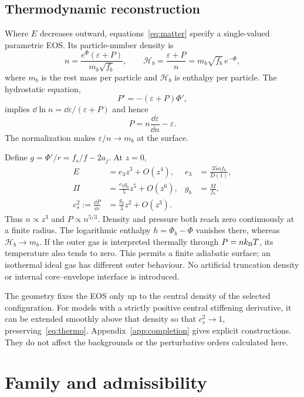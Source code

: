 \subsection{Thermodynamic reconstruction}
Where $E$ decreases outward, equations~\eqref{eq:matter} specify a single-valued parametric EOS. Its particle-number density is
\begin{equation}
 n=\frac{e^\Phi(\varepsilon+P)}{m_b\sqrt{f_b}},
 \qquad \mathcal H_b=\frac{\varepsilon+P}{n}=m_b\sqrt{f_b}\,e^{-\Phi},
 \label{eq:n}
\end{equation}
where $m_b$ is the rest mass per particle and $\mathcal H_b$ is enthalpy per particle. The hydrostatic equation,
\begin{equation}
 P'=-(\varepsilon+P)\Phi',
\end{equation}
implies $\dd\ln n=\dd\varepsilon/(\varepsilon+P)$ and hence
\begin{equation}
 P=n\frac{\dd\varepsilon}{\dd n}-\varepsilon.
 \label{eq:thermo}
\end{equation}
The normalization makes $\varepsilon/n\to m_b$ at the surface.

Define $g=\Phi'/r=f_s/f-2a_j$. At $z=0$,
\begin{align}
 E&=e_3z^3+O(z^4),& e_3&=\frac{35\alpha f_b}{D(1)},\nonumber\\
 \Pi&=\frac{e_3g_b}{5}z^5+O(z^6),&g_b&=\frac{M}{f_b},\label{eq:surfacepowers}\\
 c_s^2:=\frac{\dd P}{\dd\varepsilon}
 &=\frac{g_b}{3}z^2+O(z^3).&&\nonumber
\end{align}
Thus $n\propto z^3$ and $P\propto n^{5/3}$. Density and pressure both reach zero continuously at a finite radius. The logarithmic enthalpy $h=\Phi_b-\Phi$ vanishes there, whereas $\mathcal H_b\to m_b$. If the outer gas is interpreted thermally through $P=nk_{\rm B}T$, its temperature also tends to zero. This permits a finite adiabatic surface; an isothermal ideal gas has different outer behaviour. No artificial truncation density or internal core--envelope interface is introduced.

The geometry fixes the EOS only up to the central density of the selected configuration. For models with a strictly positive central stiffening derivative, it can be extended smoothly above that density so that $c_s^2\to1$, preserving~\eqref{eq:thermo}. Appendix~\ref{app:completion} gives explicit constructions. They do not affect the backgrounds or the perturbative orders calculated here.

\section{Family and admissibility}
